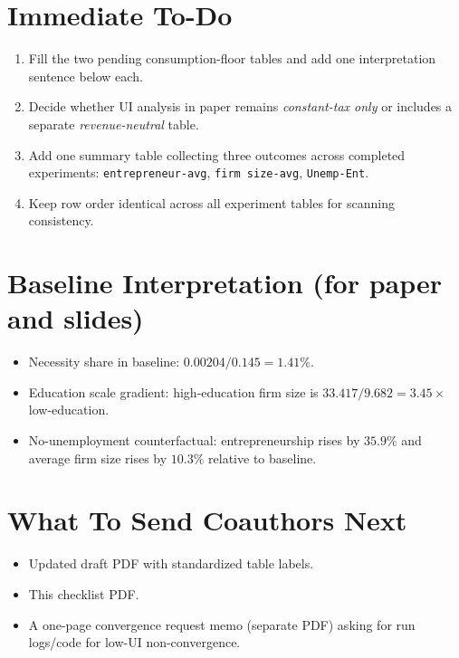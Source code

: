 \documentclass[11pt]{article}
\begin{document}
\section*{Immediate To-Do}
\begin{enumerate}[leftmargin=1.5em]
\item Fill the two pending consumption-floor tables and add one interpretation sentence below each.
\item Decide whether UI analysis in paper remains \emph{constant-tax only} or includes a separate \emph{revenue-neutral} table.
\item Add one summary table collecting three outcomes across completed experiments: \texttt{entrepreneur-avg}, \texttt{firm size-avg}, \texttt{Unemp-Ent}.
\item Keep row order identical across all experiment tables for scanning consistency.
\end{enumerate}

\section*{Baseline Interpretation (for paper and slides)}
\begin{itemize}[leftmargin=1.5em]
\item Necessity share in baseline: $0.00204/0.145 = 1.41\%$.
\item Education scale gradient: high-education firm size is $33.417/9.682 = 3.45\times$ low-education.
\item No-unemployment counterfactual: entrepreneurship rises by $35.9\%$ and average firm size rises by $10.3\%$ relative to baseline.
\end{itemize}

\section*{What To Send Coauthors Next}
\begin{itemize}[leftmargin=1.5em]
\item Updated draft PDF with standardized table labels.
\item This checklist PDF.
\item A one-page convergence request memo (separate PDF) asking for run logs/code for low-UI non-convergence.
\end{itemize}
\end{document}
